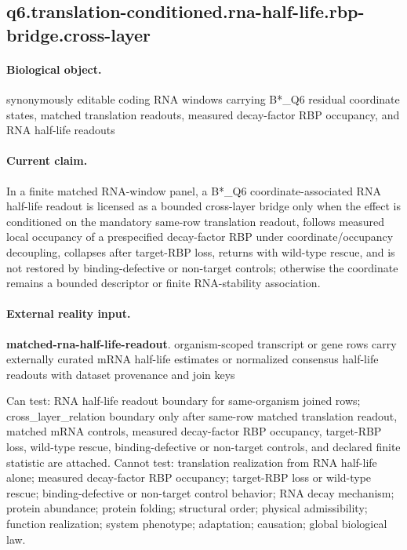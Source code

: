 \subsection{q6.translation-conditioned.rna-half-life.rbp-bridge.cross-layer}

\paragraph{Biological object.} synonymously editable coding RNA windows carrying B*\_Q6 residual coordinate states, matched translation readouts, measured decay-factor RBP occupancy, and RNA half-life readouts

\paragraph{Current claim.} In a finite matched RNA-window panel, a B*\_Q6 coordinate-associated RNA half-life readout is licensed as a bounded cross-layer bridge only when the effect is conditioned on the mandatory same-row translation readout, follows measured local occupancy of a prespecified decay-factor RBP under coordinate/occupancy decoupling, collapses after target-RBP loss, returns with wild-type rescue, and is not restored by binding-defective or non-target controls; otherwise the coordinate remains a bounded descriptor or finite RNA-stability association.

\paragraph{External reality input.}
\textbf{matched-rna-half-life-readout}. organism-scoped transcript or gene rows carry externally curated mRNA half-life estimates or normalized consensus half-life readouts with dataset provenance and join keys

Can test: RNA half-life readout boundary for same-organism joined rows; cross\_layer\_relation boundary only after same-row matched translation readout, matched mRNA controls, measured decay-factor RBP occupancy, target-RBP loss, wild-type rescue, binding-defective or non-target controls, and declared finite statistic are attached. Cannot test: translation realization from RNA half-life alone; measured decay-factor RBP occupancy; target-RBP loss or wild-type rescue; binding-defective or non-target control behavior; RNA decay mechanism; protein abundance; protein folding; structural order; physical admissibility; function realization; system phenotype; adaptation; causation; global biological law.

